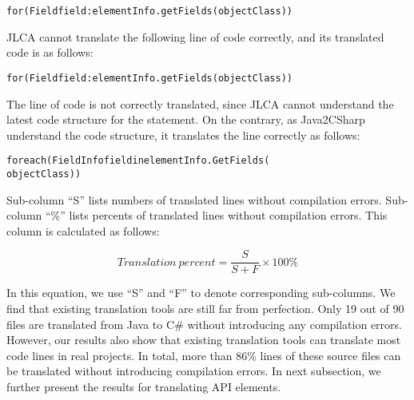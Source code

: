 \begin{CodeOut}%
\begin{alltt}
for(Field field : elementInfo.getFields(objectClass))
\end{alltt}
\end{CodeOut}

JLCA cannot translate the following line of code correctly, and its translated code is as follows:

\begin{CodeOut}%
\begin{alltt}
for(Field field: elementInfo.getFields(objectClass))
\end{alltt}
\end{CodeOut}

The line of code is not correctly translated, since JLCA cannot understand the latest code structure for the  statement. On the contrary, as Java2CSharp understand the code structure, it translates the line correctly as follows:

\begin{CodeOut}%
\begin{alltt}
foreach(FieldInfo field in elementInfo.GetFields(
                                         objectClass))
\end{alltt}
\end{CodeOut}
  
  
Sub-column ``S'' lists numbers of translated lines without compilation errors. Sub-column ``\%'' lists percents of translated lines without compilation errors. This column is calculated as follows:

\begin{equation}\label{eq-correctpercent}
Translation\ percent=\frac{S}{S+F}\times 100\%
\end{equation}%

In this equation, we use ``S'' and ``F'' to denote corresponding sub-columns. We find that existing translation tools are still far from perfection. Only 19 out of 90 files are translated from Java to C\# without introducing any compilation errors. However, our results also show that existing translation tools can translate most code lines in real projects. In total, more than 86\% lines of these source files can be translated without introducing compilation errors. In next subsection, we further present the results for translating API elements.

